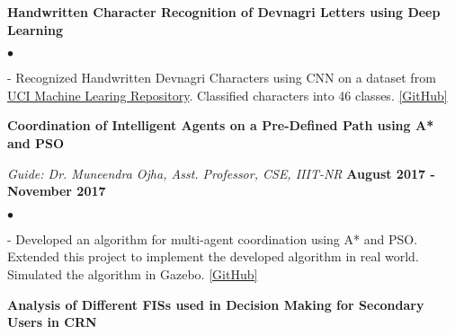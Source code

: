 \documentclass[margin,line]{res}
\newenvironment{list2}{
  \begin{list}{$\bullet$}{%
      \setlength{\itemsep}{0in}
      \setlength{\parsep}{0in} \setlength{\parskip}{0in}
      \setlength{\topsep}{0in} \setlength{\partopsep}{0in} 
      \setlength{\leftmargin}{0.2in}}}{\end{list}}
\begin{document}
\begin{resume}



\vspace{-.1in}
{\bf Handwritten Character Recognition of Devnagri Letters using Deep Learning}
\begin{list2}
\item[-] Recognized Handwritten Devnagri Characters using CNN on a dataset from \textcolor{blue}{\href{https://archive.ics.uci.edu/ml/datasets/Devanagari+Handwritten+Character+Dataset}{UCI Machine Learing Repository}}. Classified characters into 46 classes. \textcolor{blue}{\href{https://github.com/panditu2015/DL-Character-Recogntion}{[GitHub]}}
\end{list2}

\vspace{-.1in}
{\bf Coordination of Intelligent Agents on a Pre-Defined Path using A* and PSO}

\vspace{-.3cm}
{\em Guide: Dr. Muneendra Ojha, Asst. Professor, CSE, IIIT-NR} \hfill {\bf August 2017 - November 2017}\\
\vspace*{-.4cm}
\begin{list2}
\item[-] Developed an algorithm for multi-agent coordination using A* and PSO. Extended this project to implement the developed algorithm in real world. Simulated the algorithm in Gazebo. \textcolor{blue}{\href{https://github.com/panditu2015/Intelligent-Agents-Coordination}{[GitHub]}}
\end{list2}


\vspace{-.1in}
{\bf Analysis of Different FISs used in Decision Making for Secondary Users in CRN}


\end{resume}
\end{document}
